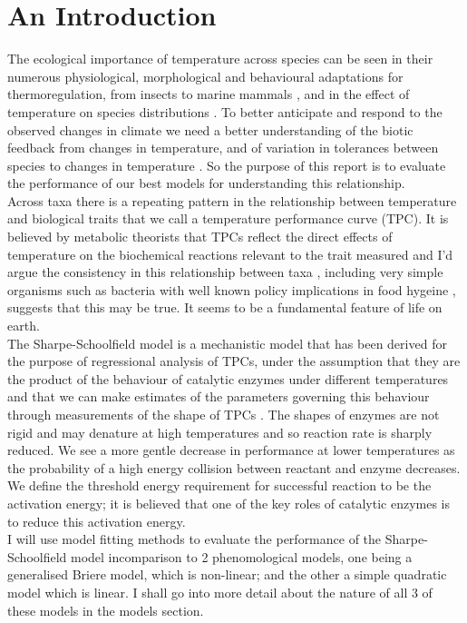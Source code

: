 \documentclass[12pt]{article}\usepackage[]{graphicx}\usepackage[]{color}
\begin{document}
  \section{An Introduction} 
  The ecological importance of temperature across species can be seen in their numerous physiological, morphological and 
  behavioural adaptations for thermoregulation, from insects to marine mammals \cite{Castellini2018,Heinrich2009}, and in the effect of temperature
  on species distributions \cite{Woodward1988,Buckley}. To better anticipate and respond to the observed changes in climate \cite{RoyalSociety}
  we need a better understanding of the biotic feedback from changes in temperature, and of variation
  in tolerances between species to changes in temperature \cite{Buckley}. So the purpose of this report is to evaluate the performance of our best models
  for understanding this relationship.\\
  Across taxa there is a repeating pattern in the relationship between temperature and biological traits that we call a temperature performance curve (TPC). 
  It is believed by metabolic theorists that TPCs reflect the direct effects 
  of temperature on the biochemical reactions relevant to the trait measured and I'd argue the consistency in this relationship between taxa \cite{Dell2011a}, including 
  very simple organisms such as bacteria with well known policy implications in food hygeine \cite{Zwietering1991b}, suggests that this may be true. 
  It seems to be a fundamental feature of life on earth. \\
  The Sharpe-Schoolfield model is a mechanistic model that has been derived for the purpose of regressional 
  analysis of TPCs, under the assumption that they are the product of the behaviour of catalytic enzymes under different temperatures and that we can make 
  estimates of the parameters governing this behaviour through measurements of the shape of TPCs \cite{Schoolfield1981}. The shapes of enzymes are not 
  rigid and may denature at high temperatures and so reaction rate is sharply reduced. We see a more gentle decrease in performance at lower temperatures as the probability of a high energy collision 
  between reactant and enzyme decreases. We define the threshold energy requirement for successful reaction to be the activation energy; it is believed that
  one of the key roles of catalytic enzymes is to reduce this activation energy. \\ 
  I will use model fitting methods to evaluate the performance of the Sharpe-Schoolfield model incomparison to 2 phenomological models, one being a 
  generalised Briere model, which is non-linear; 
  and the other a simple quadratic model which is linear. I shall go into more detail about the nature of all 3 of these models in the models section. \\
\end{document}
